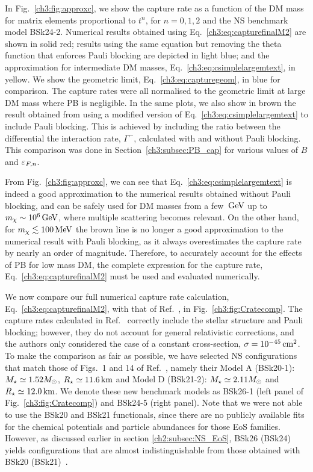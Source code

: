 In Fig.~\ref{ch3:fig:approxc}, we show the capture rate as a function of the DM mass for matrix elements proportional to $t^n$, for $n=0,1,2$ and the NS benchmark model BSk24-2. Numerical results obtained using Eq.~\ref{ch3:eq:capturefinalM2} are shown in solid red; results using the same equation but removing the theta function that enforces Pauli blocking are depicted in light blue; and the approximation for intermediate DM masses, Eq.~\ref{ch3:eq:csimplelargemtext}, in yellow. We show the geometric limit, Eq.~\ref{ch3:eq:capturegeom}, in blue for comparison. 
The capture rates were all normalised to the geometric limit at large DM mass where PB is negligible. 
In the same plots, we also show in brown the result obtained from using a modified version of Eq.~\ref{ch3:eq:csimplelargemtext} to include Pauli blocking.
This is achieved by including the ratio between the differential the interaction rate, $\Gamma^-$, calculated with and without Pauli blocking. This comparison was done in Section~\ref{ch3:subsec:PB_cap} for various values of $B$ and $\varepsilon_{F,n}$.

From Fig.~\ref{ch3:fig:approxc}, we can see that Eq.~\ref{ch3:eq:csimplelargemtext} is indeed a good approximation to the numerical results obtained without Pauli blocking, and can be safely used for DM masses from a few ${\rm \,GeV}$ up to $m_\chi\sim10^6{\rm \,GeV}$, where multiple scattering becomes relevant. 
On the other hand, for $m_\chi\lesssim 100{\rm \,MeV}$ the brown line is no longer a good approximation to the numerical result with Pauli blocking, as it always overestimates the capture rate by nearly an order of magnitude. Therefore, to accurately account for the effects of PB for low mass DM, the complete expression for the capture rate, Eq.~\ref{ch3:eq:capturefinalM2} must be used and evaluated numerically.

We now compare our full numerical capture rate calculation, Eq.~\ref{ch3:eq:capturefinalM2}, with that of Ref.~\cite{Garani:2018kkd_may_NewAnalysisNeutron}, in Fig.~\ref{ch3:fig:Cratecomp}. The capture rates calculated in Ref.~\cite{Garani:2018kkd_may_NewAnalysisNeutron} correctly include the stellar structure and Pauli blocking; however, they do not account for general relativistic corrections, and the authors only considered the case of a constant cross-section, $\sigma=10^{-45}{\rm \,cm}^2$. To make the comparison as fair as possible, we have selected NS configurations that match those of Figs.~1 and 14 of Ref.~\cite{Garani:2018kkd_may_NewAnalysisNeutron}, namely their Model A (BSk20-1):  $M_\star\simeq1.52M_\odot$, $R_\star\simeq11.6{\rm \,km}$ and Model D (BSk21-2): $M_\star\simeq2.11M_\odot$ and $R_\star\simeq12.0{\rm \,km}$. We denote these new benchmark models as BSk26-1 (left panel of Fig.~\ref{ch3:fig:Cratecomp}) and BSk24-5 (right panel). Note that we were not able to use the BSk20 and BSk21 functionals, since there are no publicly available fits for the chemical potentials and particle abundances for those EoS families. However, as discussed earlier in section \ref{ch2:subsec:NS_EoS}, BSk26 (BSk24) yields configurations that are almost indistinguishable from those obtained with BSk20 (BSk21)~\cite{Perot:2019gwl_Rolesymmetryenergy}.

